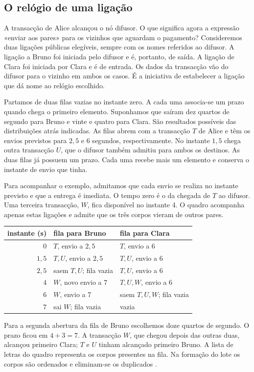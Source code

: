 \subsection{O relógio de uma ligação}
\label{subsec:dandelion-fila-ligacao}

A transacção de Alice alcançou o nó difusor. O que significa agora a
expressão «enviar aos pares» para os vizinhos que aguardam o pagamento?
Consideremos duas ligações públicas elegíveis, sempre com os nomes
referidos ao difusor. A ligação a Bruno foi iniciada pelo difusor e é,
portanto, de saída. A ligação de Clara foi iniciada por Clara e é de
entrada. Os dados da transacção vão do difusor para o vizinho em ambos
os casos. É a iniciativa de estabelecer a ligação que dá nome ao
relógio escolhido.

Partamos de duas filas vazias no instante zero. A cada uma associa-se
um prazo quando chega o primeiro elemento. Suponhamos que saíram dez
quartos de segundo para Bruno e vinte e quatro para Clara. São
resultados possíveis das distribuições atrás indicadas. As filas
abrem com a transacção \(T\) de Alice e têm os envios previstos para
\(2{,}5\) e \(6\) segundos, respectivamente. No instante
\(1{,}5\) chega outra transacção \(U\), que o difusor também admitiu
para ambos os destinos. As duas filas já possuem um prazo. Cada uma
recebe mais um elemento e conserva o instante de envio que tinha.

Para acompanhar o exemplo, admitamos que cada envio se realiza no
instante previsto e que a entrega é imediata. O tempo zero é o da
chegada de \(T\) ao difusor. Uma terceira transacção, \(W\), fica
disponível no instante 4. O quadro acompanha apenas estas ligações e
admite que os três corpos vieram de outros pares.
\begin{center}
\begin{tabular}{r|l|l}
instante (s)&fila para Bruno&fila para Clara\\
\hline
\(0\)&\(T\), envio a \(2{,}5\)&\(T\), envio a 6\\
\(1{,}5\)&\(T,U\), envio a \(2{,}5\)&\(T,U\), envio a 6\\
\(2{,}5\)&saem \(T,U\); fila vazia&\(T,U\), envio a 6\\
\(4\)&\(W\), novo envio a 7&\(T,U,W\), envio a 6\\
\(6\)&\(W\), envio a 7&saem \(T,U,W\); fila vazia\\
\(7\)&sai \(W\); fila vazia&vazia
\end{tabular}
\end{center}
Para a segunda abertura da fila de Bruno escolhemos doze quartos de
segundo. O prazo ficou em \(4+3=7\). A transacção \(W\), que chegou
depois das outras duas, alcançou primeiro Clara; \(T\) e \(U\) tinham
alcançado primeiro Bruno. A lista de letras do quadro representa os
corpos presentes na fila. Na formação do lote os corpos são ordenados
e eliminam-se os duplicados \cite{monero-source-v16}.


